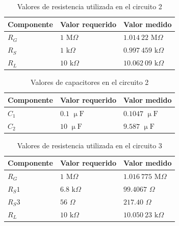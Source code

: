 \documentclass[journal]{IEEEtran}
\begin{document}
\begin{table}[H]
        \centering
        \renewcommand{\arraystretch}{1.5}
        \caption{Valores de resistencia utilizada en el circuito 2}
        \begin{tabular}{ >{\centering\arraybackslash}m{2.5cm} >{\centering\arraybackslash}m{2.5cm} >{\centering\arraybackslash}m{2.5cm} }
                \hline
            Componente & Valor requerido & Valor medido\\ 
            \hline
            \centering
            $R_G$ & $1$ $\mathrm{M}\Omega$ & $1.014~22$ $\mathrm{M}\Omega$ \\ 
            $R_S$ & $1$ $\mathrm{k}\Omega$ & $0.997~459$ $\mathrm{k}\Omega$ \\
            $R_L$ & $10$ $\mathrm{k}\Omega$ & $10.062~09$ $\mathrm{k}\Omega$ \\
            \hline
        \end{tabular}
        \label{tabla3}
    \end{table}

\begin{table}[H]
        \renewcommand{\arraystretch}{1.5}
        \caption{Valores de capacitores en el circuito 2}
        \centering
        \begin{tabular}{ >{\centering\arraybackslash}m{2.5cm} >{\centering\arraybackslash}m{2.5cm} >{\centering\arraybackslash}m{2.5cm} }
                \hline
            Componente & Valor requerido & Valor medido\\ 
            \hline
            $C_1$ & $0.1$ $\upmu\mathrm{F}$ & $0.1047$ $\upmu\mathrm{F}$ \\ 
            $C_2$ & $10$ $\upmu\mathrm{F}$ & $9.587$ $\upmu\mathrm{F}$ \\
            \hline
        \end{tabular}
        \label{tabla4}
    \end{table}

\begin{table}[H]
        \renewcommand{\arraystretch}{1.5}
        \caption{Valores de resistencia utilizada en el circuito 3}
        \centering
        \begin{tabular}{ >{\centering\arraybackslash}m{2.5cm} >{\centering\arraybackslash}m{2.5cm} >{\centering\arraybackslash}m{2.5cm} }
                \hline
            Componente & Valor requerido & Valor medido\\ 
            \hline
            $R_G$ & $1$ $\mathrm{M}\Omega$ & $1.016~775$ $\mathrm{M}\Omega$ \\ 
            $R_S1$ & $6.8$ $\mathrm{k}\Omega$ & $99.4067$ $\Omega$ \\
            $R_S3$ & $56$ $\Omega$ & $217.40$ $\Omega$ \\
            $R_L$ & $10$ $\mathrm{k}\Omega$ & $10.050~23$ $\mathrm{k}\Omega$ \\
            \hline
        \end{tabular}
        \label{tabla5}
    \end{table}
\end{document}
